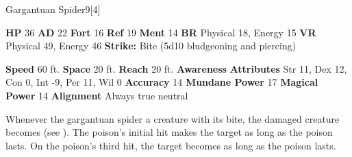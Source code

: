   \begin{monsubsection}{Gargantuan Spider}{9}[4]
    \vspace{-1em}\vspace{-1em}
    \vspace{0em}

    
    

    \begin{spellcontent}
      \begin{spelltargetinginfo}
        \pari \textbf{HP} 36 \monsep
          \textbf{AD} 22 \monsep
          \textbf{Fort} 16 \monsep
          \textbf{Ref} 19 \monsep
          \textbf{Ment} 14
        \pari \textbf{BR} Physical 18, Energy 15 \monsep
        \textbf{VR} Physical 49, Energy 46
        \pari \textbf{Strike:}
            Bite  (5d10 bludgeoning and piercing)
      \end{spelltargetinginfo}
    \end{spellcontent}
    \begin{monsterfooter}
      \pari \textbf{Speed} 60 ft. \monsep
        \textbf{Space} 20 ft. \monsep
        \textbf{Reach} 20 ft.
      \pari \textbf{Awareness} 
      \pari \textbf{Attributes}
        Str 11, Dex 12,
        Con 0, Int -9,
        Per 11, Wil 0
      \pari \textbf{Accuracy} 14 \monsep
        \textbf{Mundane Power} 17 \monsep
      \textbf{Magical Power} 14
      \pari \textbf{Alignment} Always true neutral
    \end{monsterfooter}
  \end{monsubsection}
        Whenever the gargantuan spider  a creature with its bite,
          the damaged creature becomes  (see ).
        The poison's initial hit makes the target  as long as the poison lasts.
        On the poison's third hit, the target becomes  as long as the poison lasts.
  

